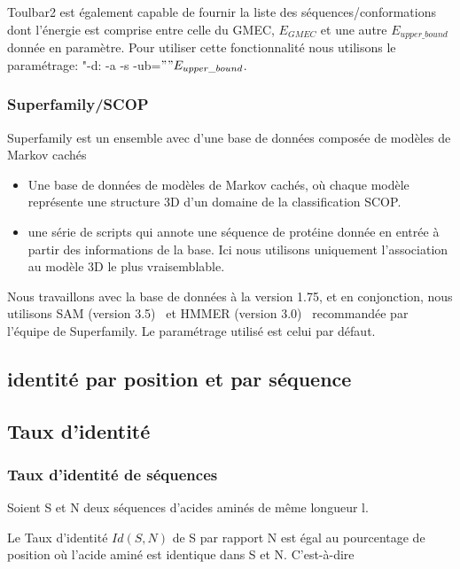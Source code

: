 Toulbar2 est également capable de fournir la liste des séquences/conformations dont l'énergie est comprise entre celle du GMEC, $E_{GMEC}$ et une autre $E_{upper\_bound}$ donnée en paramètre. Pour utiliser cette fonctionnalité nous utilisons le paramétrage:  "-d: -a -s -ub=$""E_{upper\_bound}$.

   \subsubsection{Superfamily/SCOP} 

Superfamily est un ensemble avec d'une base de données composée de modèles de Markov cachés~\citep{refSuperfamily}

\begin{itemize}
\item Une base de données de modèles de Markov cachés, où chaque modèle représente une structure 3D d'un domaine de la classification SCOP.
\item une série de scripts qui annote une séquence de protéine donnée en entrée à partir des informations de la base. Ici nous utilisons uniquement l'association au modèle 3D le plus vraisemblable. 
\end{itemize}

Nous travaillons avec la base de données à la version 1.75, et en conjonction, nous utilisons SAM (version 3.5)~\citep{refSam} et HMMER (version 3.0)~\citep{refHmmer} recommandée par l'équipe de Superfamily. Le paramétrage utilisé est celui par défaut.

\subsection{identité par position et par séquence}

\subsection{Taux d'identité}


\subsubsection{Taux d'identité de séquences}

Soient S et N deux séquences d'acides aminés de même longueur l.

Le Taux d'identité $Id(S,N)$ de S par rapport N est égal au pourcentage de position où l'acide aminé est identique dans S et N. C'est-à-dire

